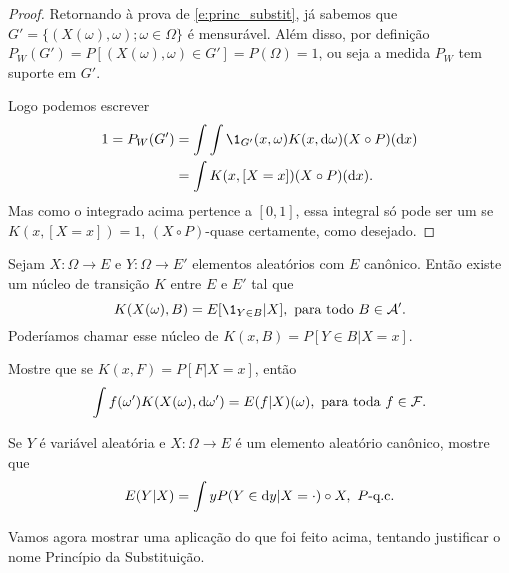 \documentclass[../Notas_de_aula.tex]{subfiles}
\begin{document}
\begin{proof}
  Retornando à prova de \eqref{e:princ_substit}, já sabemos que $G' = \{(X(\omega), \omega); \omega \in \Omega\}$ é mensurável.
  Além disso, por definição $P_W(G') = P[(X(\omega), \omega) \in G'] = P(\Omega) = 1$, ou seja a medida $P_W$ tem suporte em $G'$.

  Logo podemos escrever
  \begin{equation}
    \begin{split}
      1 = P_W(G') & = \int \int \1_{G'} (x, \omega) K(x, \d \omega) (X \circ P) (\d x)\\
      & = \int K(x, [X = x]) (X \circ P) (\d x).
    \end{split}
  \end{equation}
  Mas como o integrado acima pertence a $[0,1]$, essa integral só pode ser um se $K(x, [X = x]) = 1$, $(X \circ P)$-quase certamente, como desejado.
\end{proof}

\begin{exercise}
  Sejam $X: \Omega \to E$ e $Y: \Omega \to E'$ elementos aleatórios com $E$ canônico.
  Então existe um núcleo de transição $K$ entre $E$ e $E'$ tal que
  \begin{equation}
    \label{e:regular_cond_prob_givenX}
    K(X(\omega), B) = E[\1_{Y \in B} | X], \text{ para todo $B \in \mathcal{A}'$}.
  \end{equation}
  Poderíamos chamar esse núcleo de $K(x, B) = P[Y \in B | X = x]$.
\end{exercise}

\begin{exercise}
  Mostre que se $K(x, F) = P[F| X = x]$, então
  \begin{equation}
    \label{e:reg_cond_exp_givenX}
    \int f(\omega') K(X(\omega), \mathop{}\!\mathrm{d} \omega') = E(f | X)(\omega), \text{ para toda $f \in \mathcal{F}$}.
  \end{equation}
\end{exercise}

\begin{exercise}
  Se $Y$ é variável aleatória e $X: \Omega \to E$ é um elemento aleatório canônico, mostre que
  \begin{equation}
    E(Y|X) = \int y P(Y \in \mathop{}\!\mathrm{d} y|X = \cdot) \circ X, \text{ $P$-q.c.}
  \end{equation}
\end{exercise}

Vamos agora mostrar uma aplicação do que foi feito acima, tentando justificar o nome Princípio da Substituição.
\end{document}
